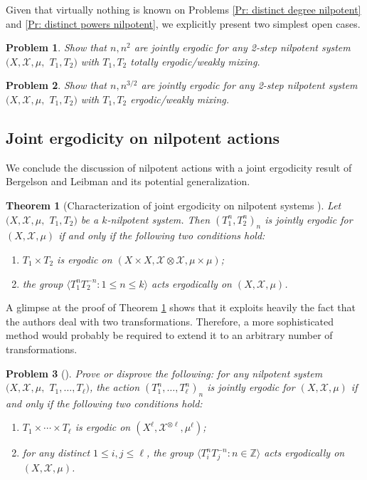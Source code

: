\documentclass[11pt]{amsart}
\newtheorem{theorem}[lemma]{Theorem}
\newtheorem{problem}{Problem}
\theoremstyle{definition}
\newcommand{\Z}{{\mathbb Z}}
\newcommand{\CX}{{\mathcal X}}
\newcommand{\1}{{\mathbf{1}}}
\begin{document}
Given that virtually nothing is known on Problems \ref{Pr: distinct degree nilpotent} and \ref{Pr: distinct powers nilpotent}, we explicitly present two simplest open cases.
\begin{problem}
    Show that $n, n^2$ are jointly ergodic for any 2-step nilpotent system $(X, \CX, \mu,$\! $T_1, T_2)$ with $T_1, T_2$ totally ergodic/weakly mixing.
\end{problem}
\begin{problem}
    Show that $n, n^{3/2}$ are jointly ergodic for any 2-step nilpotent system $(X, \CX, \mu,$\! $T_1, T_2)$ with $T_1, T_2$ ergodic/weakly mixing.
\end{problem}
\subsection{Joint ergodicity on nilpotent actions}
We conclude the discussion of nilpotent actions with a joint ergodicity result of Bergelson and Leibman and its potential generalization.
\begin{theorem}[Characterization of joint ergodicity on nilpotent systems {\cite[Theorem B]{BL02}}]\label{T: BL nilpotent joint ergodicity}
    Let $(X, \CX, \mu,$\! $T_1, T_2)$ be a $k$-nilpotent system. Then $(T_1^n, T_2^n)_n$ is jointly ergodic for $(X,\CX,\mu)$ if and only if the following two conditions hold:
    \begin{enumerate}
        \item $T_1 \times T_2$ is ergodic on $(X\times X, \CX\otimes \CX, \mu\times\mu)$;
        \item the group $\langle T_1^nT_2^{-n}\colon 1\leq n\leq k\rangle$ acts ergodically on $(X, \CX, \mu)$.
    \end{enumerate}
\end{theorem}
A glimpse at the proof of Theorem \ref{T: BL nilpotent joint ergodicity} shows that it exploits heavily the fact that the authors deal with two transformations. Therefore, a more sophisticated method would probably be required to extend it to an arbitrary number of transformations.
\begin{problem}[{\cite[Conjecture 5.5]{BL02}}]
    Prove or disprove the following: for any nilpotent system $(X, \CX, \mu,$\! $T_1, \ldots, T_\ell)$, the action $(T_1^n, \ldots, T_\ell^n)_n$ is jointly ergodic for $(X,\CX,\mu)$ if and only if the following two conditions hold:
    \begin{enumerate}
        \item $T_1 \times \cdots \times T_\ell$ is ergodic on $(X^\ell, \CX^{\otimes \ell}, \mu^\ell)$;
        \item for any distinct $1\leq i, j\leq \ell$, the group $\langle T_i^nT_j^{-n}\colon n\in\Z\rangle$ acts ergodically on $(X, \CX, \mu)$.
    \end{enumerate}
\end{problem}
\end{document}
